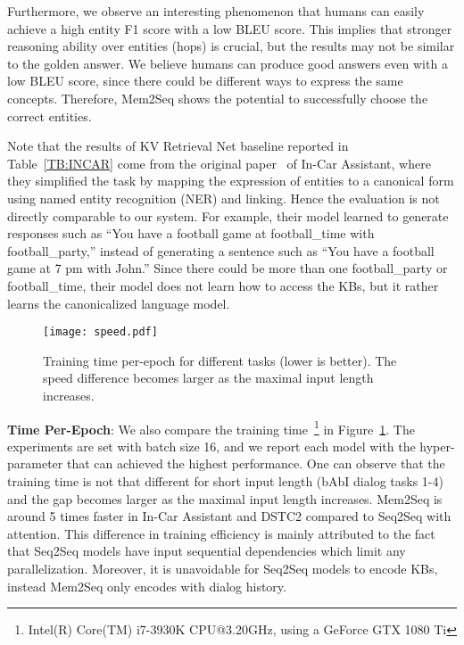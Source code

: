 \documentclass[11pt,a4paper]{article}
\begin{document}
Furthermore, we observe an interesting phenomenon that humans can easily achieve a high entity F1 score with a low BLEU score. This implies that stronger reasoning ability over entities (hops) is crucial, but the results may not be similar to the golden answer. We believe humans can produce good answers even with a low BLEU score, since there could be different ways to express the same concepts. Therefore, Mem2Seq shows the potential to successfully choose the correct entities. 

Note that the results of KV Retrieval Net baseline reported in Table~\ref{TB:INCAR} come from the original paper~\cite{ericKVR2017} of In-Car Assistant, where they simplified the task by mapping the expression of entities to a canonical form using named entity recognition (NER) and linking. Hence the evaluation is not directly comparable to our system. For example, their model learned to generate responses such as ``You have a football game at football\_time with football\_party,'' instead of generating a sentence such as ``You have a football game at 7 pm with John.'' Since there could be more than one football\_party or football\_time, their model does not learn how to access the KBs, but it rather learns the canonicalized language model. 

\begin{figure}[t]
\texttt{[image: speed.pdf]}
\setlength{\abovecaptionskip}{-10pt} 
\caption{Training time per-epoch for different tasks (lower is better). The speed difference becomes larger as the maximal input length increases.}
\label{FIG:speed}
\end{figure}

\noindent\textbf{Time Per-Epoch}: 
We also compare the training time~\footnote{Intel(R) Core(TM) i7-3930K CPU@3.20GHz, using a GeForce GTX 1080 Ti} in Figure~\ref{FIG:speed}. The experiments are set with batch size 16, and we report each model with the hyper-parameter that can achieved the highest performance. One can observe that the training time is not that different for short input length (bAbI dialog tasks 1-4) and the gap becomes larger as the maximal input length increases. Mem2Seq is around 5 times faster in In-Car Assistant and DSTC2 compared to Seq2Seq with attention. This difference in training efficiency is mainly attributed to the fact that Seq2Seq models have input sequential dependencies which limit any parallelization. Moreover, it is unavoidable for Seq2Seq models to encode KBs, instead Mem2Seq only encodes with dialog history.
\end{document}
